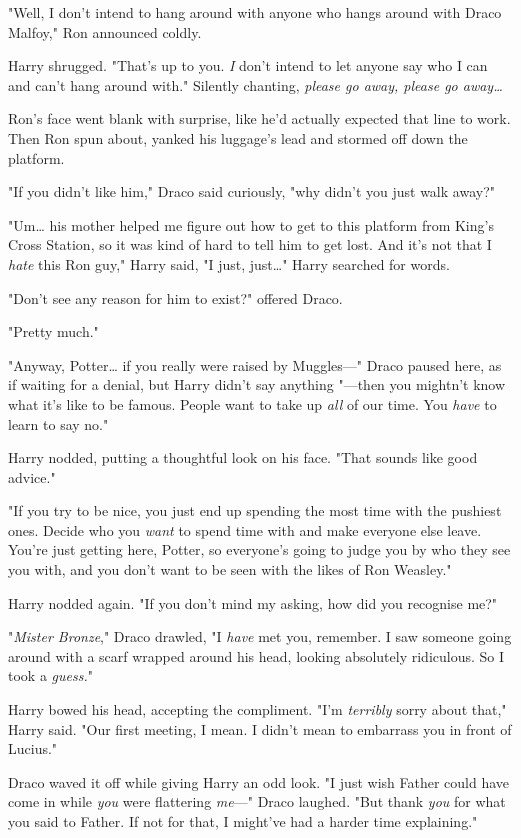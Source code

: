 "Well, I don't intend to hang around with anyone who hangs around with Draco
Malfoy," Ron announced coldly.

Harry shrugged. "That's up to you. \emph{I} don't intend to let anyone say who
I can and can't hang around with." Silently chanting, \emph{please go away,
please go away{\ldots}}

Ron's face went blank with surprise, like he'd actually expected that line to
work. Then Ron spun about, yanked his luggage's lead and stormed off down the
platform.

"If you didn't like him," Draco said curiously, "why didn't you just walk away?"

"Um{\ldots} his mother helped me figure out how to get to this platform from
King's Cross Station, so it was kind of hard to tell him to get lost. And
it's not that I \emph{hate} this Ron guy," Harry said, "I just, just{\ldots}"
Harry searched for words.

"Don't see any reason for him to exist?" offered Draco.

"Pretty much."

"Anyway, Potter{\ldots} if you really were raised by Muggles---" Draco paused
here, as if waiting for a denial, but Harry didn't say anything "---then you
mightn't know what it's like to be famous. People want to take up \emph{all} of
our time. You \emph{have} to learn to say no."

Harry nodded, putting a thoughtful look on his face. "That sounds like good
advice."

"If you try to be nice, you just end up spending the most time with the
pushiest ones. Decide who you \emph{want} to spend time with and make everyone
else leave. You're just getting here, Potter, so everyone's going to judge you
by who they see you with, and you don't want to be seen with the likes of Ron
Weasley."

Harry nodded again. "If you don't mind my asking, how did you recognise me?"

"\emph{Mister Bronze}," Draco drawled, "I \emph{have} met you, remember. I saw
someone going around with a scarf wrapped around his head, looking absolutely
ridiculous. So I took a \emph{guess.}"

Harry bowed his head, accepting the compliment. "I'm \emph{terribly} sorry
about that," Harry said. "Our first meeting, I mean. I didn't mean to embarrass
you in front of Lucius."

Draco waved it off while giving Harry an odd look. "I just wish Father could
have come in while \emph{you} were flattering \emph{me}---" Draco laughed. "But
thank \emph{you} for what you said to Father. If not for that, I might've had a
harder time explaining."

